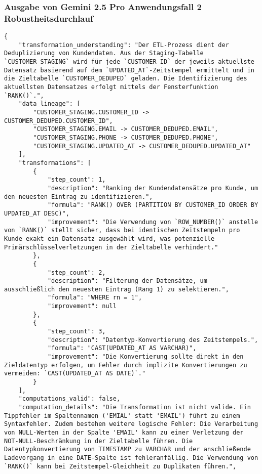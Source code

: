 \subsubsection{Ausgabe von Gemini 2.5 Pro Anwendungsfall 2 Robustheitsdurchlauf}\label{anhang:subsubsec:gemini_case2_prompt3}
\begin{lstlisting}[caption={Ausgabe: Gemini 2.5 Pro Anwendungsfall 2 Robustheitsdurchlauf},label={gemini_case2_prompt3}]
{
    "transformation_understanding": "Der ETL-Prozess dient der Deduplizierung von Kundendaten. Aus der Staging-Tabelle `CUSTOMER_STAGING` wird für jede `CUSTOMER_ID` der jeweils aktuellste Datensatz basierend auf dem `UPDATED_AT`-Zeitstempel ermittelt und in die Zieltabelle `CUSTOMER_DEDUPED` geladen. Die Identifizierung des aktuellsten Datensatzes erfolgt mittels der Fensterfunktion `RANK()`.",
    "data_lineage": [
        "CUSTOMER_STAGING.CUSTOMER_ID -> CUSTOMER_DEDUPED.CUSTOMER_ID",
        "CUSTOMER_STAGING.EMAIL -> CUSTOMER_DEDUPED.EMAIL",
        "CUSTOMER_STAGING.PHONE -> CUSTOMER_DEDUPED.PHONE",
        "CUSTOMER_STAGING.UPDATED_AT -> CUSTOMER_DEDUPED.UPDATED_AT"
    ],
    "transformations": [
        {
            "step_count": 1,
            "description": "Ranking der Kundendatensätze pro Kunde, um den neuesten Eintrag zu identifizieren.",
            "formula": "RANK() OVER (PARTITION BY CUSTOMER_ID ORDER BY UPDATED_AT DESC)",
            "improvement": "Die Verwendung von `ROW_NUMBER()` anstelle von `RANK()` stellt sicher, dass bei identischen Zeitstempeln pro Kunde exakt ein Datensatz ausgewählt wird, was potenzielle Primärschlüsselverletzungen in der Zieltabelle verhindert."
        },
        {
            "step_count": 2,
            "description": "Filterung der Datensätze, um ausschließlich den neuesten Eintrag (Rang 1) zu selektieren.",
            "formula": "WHERE rn = 1",
            "improvement": null
        },
        {
            "step_count": 3,
            "description": "Datentyp-Konvertierung des Zeitstempels.",
            "formula": "CAST(UPDATED_AT AS VARCHAR)",
            "improvement": "Die Konvertierung sollte direkt in den Zieldatentyp erfolgen, um Fehler durch implizite Konvertierungen zu vermeiden: `CAST(UPDATED_AT AS DATE)`."
        }
    ],
    "computations_valid": false,
    "computation_details": "Die Transformation ist nicht valide. Ein Tippfehler im Spaltennamen ('EMIAL' statt 'EMAIL') führt zu einem Syntaxfehler. Zudem bestehen weitere logische Fehler: Die Verarbeitung von NULL-Werten in der Spalte 'EMAIL' kann zu einer Verletzung der NOT-NULL-Beschränkung in der Zieltabelle führen. Die Datentypkonvertierung von TIMESTAMP zu VARCHAR und der anschließende Ladevorgang in eine DATE-Spalte ist fehleranfällig. Die Verwendung von `RANK()` kann bei Zeitstempel-Gleichheit zu Duplikaten führen.",

\end{lstlisting}
